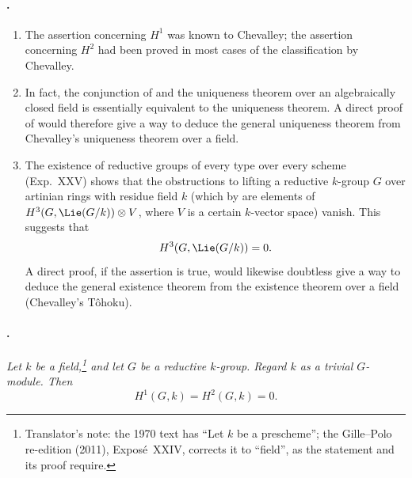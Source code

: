 \paragraph{.}
\begin{enumerate}
\item[(i)] The assertion concerning \(H^1\) was known to Chevalley;
the assertion concerning \(H^2\) had been proved in most cases of
the classification by Chevalley.
\item[(ii)] In fact, the conjunction of  and the
uniqueness theorem over an algebraically closed field is essentially
equivalent to the uniqueness theorem. A direct proof of
 would therefore give a way to deduce the general
uniqueness theorem from Chevalley's uniqueness theorem over a field.
\item[(iii)] The existence of reductive groups of every type over every scheme
\textup{(Exp.~XXV)} shows that the obstructions to lifting a
reductive \(k\)-group \(G\) over artinian rings with residue field
\(k\) (which by  are elements of
\(H^3(G,\Lie(G/k))\otimes V\), where \(V\) is a certain \(k\)-vector space)
vanish. This suggests that
\[
  H^3(G,\Lie(G/k))=0.
\]
A direct proof, if the assertion is true, would likewise doubtless
give a way to deduce the general existence theorem from the
existence theorem over a field \textup{(Chevalley's Tôhoku)}.
\end{enumerate}

\paragraph{.}
\emph{Let \(k\) be a field,\footnote{Translator's note: the 1970 text has ``Let \(k\) be a
prescheme''; the Gille--Polo re-edition (2011), Exposé~XXIV, corrects it to ``field'', as the
statement and its proof require.} and let \(G\) be a reductive
\(k\)-group. Regard \(k\) as a trivial \(G\)-module. Then}
\[
  H^1(G,k)=H^2(G,k)=0.
\]
